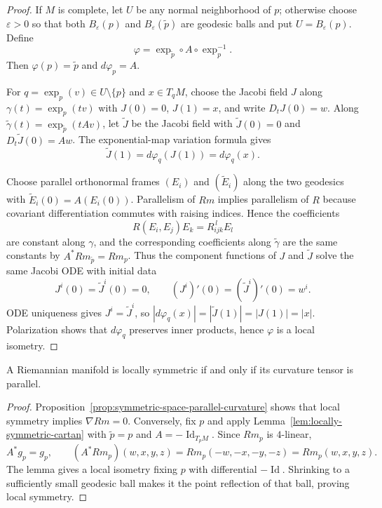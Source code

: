 \begin{proof}
\sketch If $M$ is complete, let $U$ be any normal neighborhood of $p$;
otherwise choose $\varepsilon>0$ so that both
$B_\varepsilon(p)$ and $B_\varepsilon(\widetilde p)$ are geodesic balls and
put $U=B_\varepsilon(p)$. Define
\[
\varphi=\exp_{\widetilde p}\circ A\circ\exp_p^{-1}.
\]
Then $\varphi(p)=\widetilde p$ and $d\varphi_p=A$.

For $q=\exp_p(v)\in U\setminus\{p\}$ and $x\in T_qM$, choose the Jacobi field
$J$ along $\gamma(t)=\exp_p(tv)$ with $J(0)=0$, $J(1)=x$, and write
$D_tJ(0)=w$. Along
$\widetilde\gamma(t)=\exp_{\widetilde p}(tA v)$, let
$\widetilde J$ be the Jacobi field with
$\widetilde J(0)=0$ and $D_t\widetilde J(0)=Aw$. The exponential-map
variation formula gives
\[
\widetilde J(1)=d\varphi_q(J(1))=d\varphi_q(x).
\]

Choose parallel orthonormal frames $(E_i)$ and $(\widetilde E_i)$ along the
two geodesics with $\widetilde E_i(0)=A(E_i(0))$. Parallelism of $Rm$ implies
parallelism of $R$ because covariant differentiation commutes with raising
indices. Hence the
coefficients
\[
R(E_i,E_j)E_k=R_{ijk}^{\,l}E_l
\]
are constant along $\gamma$, and the corresponding coefficients along
$\widetilde\gamma$ are the same constants by $A^*Rm_{\widetilde p}=Rm_p$.
Thus the component functions of $J$ and $\widetilde J$ solve the same Jacobi
ODE with initial data
\[
J^i(0)=\widetilde J^i(0)=0,
\qquad
(J^i)'(0)=(\widetilde J^i)'(0)=w^i.
\]
ODE uniqueness gives $J^i=\widetilde J^i$, so
$|d\varphi_q(x)|=|\widetilde J(1)|=|J(1)|=|x|$. Polarization shows that
$d\varphi_q$ preserves inner products, hence $\varphi$ is a local isometry.
\end{proof}

\begin{theorem}
\label{thm:characterization-locally-symmetric-spaces}

A Riemannian manifold is locally symmetric if and only if its curvature
tensor is parallel.

\begin{proof}
\sketch Proposition~\ref{prop:symmetric-space-parallel-curvature} shows that
local symmetry implies $\nabla Rm=0$.
Conversely, fix $p$ and apply
Lemma~\ref{lem:locally-symmetric-cartan} with $\widetilde p=p$ and
$A=-\operatorname{Id}_{T_pM}$. Since $Rm_p$ is $4$-linear,
\[
A^*g_p=g_p,
\qquad
(A^*Rm_p)(w,x,y,z)=Rm_p(-w,-x,-y,-z)=Rm_p(w,x,y,z).
\]
The lemma gives a local isometry fixing $p$ with differential
$-\operatorname{Id}$. Shrinking to a sufficiently small geodesic ball makes
it the point reflection of that ball, proving local symmetry.
\end{proof}
\end{theorem}

